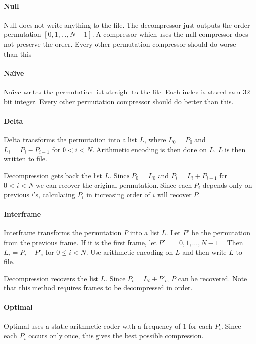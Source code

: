 \documentclass{report}
\begin{document}
\paragraph{Null}
Null does not write anything to the file. The decompressor just outputs the
order permutation $[0,1,\dots,N-1]$. A compressor which uses the null
compressor does not preserve the order. Every other permutation compressor
should do worse than this.

\paragraph{Na\"{\i}ve}
Na\"{\i}ve writes the permutation list straight to the file. Each index is
stored as a $32$-bit integer. Every other permutation compressor should do
better than this.

\paragraph{Delta}
Delta transforms the permutation into a list $L$, where $L_0 = P_0$ and $L_i =
P_i - P_{i-1}$ for $0 < i < N$. Arithmetic encoding is then done on $L$. $L$
is then written to file.

Decompression gets back the list $L$. Since $P_0 = L_0$ and $P_i = L_i +
P_{i-1}$ for $0 < i < N$ we can recover the original permutation. Since each
$P_i$ depends only on previous $i$'s, calculating $P_i$ in increasing order of
$i$ will recover $P$.

\paragraph{Interframe}
Interframe transforms the permutation $P$ into a list $L$. Let $P'$ be the
permutation from the previous frame. If it is the first frame, let $P' =
[0,1,\dots,N-1]$. Then $L_i = P_i - P'_i$ for $0 \le i < N$. Use arithmetic
encoding on $L$ and then write $L$ to file.

Decompression recovers the list $L$. Since $P_i = L_i + P'_i$, $P$ can be
recovered. Note that this method requires frames to be decompressed in order.

\paragraph{Optimal}
Optimal uses a static arithmetic coder with a frequency of $1$ for each
$P_i$. Since each $P_i$ occurs only once, this gives the best possible
compression.
\end{document}
